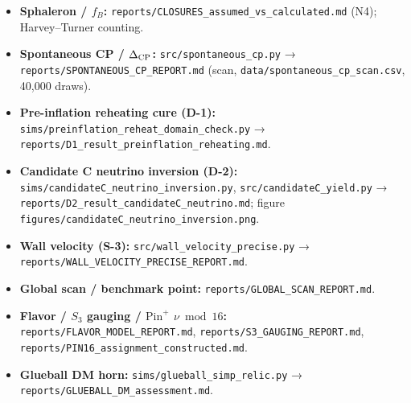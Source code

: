\documentclass[aps,prd,preprint,nofootinbib,superscriptaddress]{revtex4-2}
\providecommand{\tightlist}{\setlength{\itemsep}{0pt}\setlength{\parskip}{0pt}}
\begin{document}
\begin{itemize}
\tightlist
\item
  \textbf{Sphaleron / \(f_B\):}
  \texttt{reports/\allowbreak CLOSURES\_\allowbreak assumed\_\allowbreak vs\_\allowbreak calculated.\allowbreak md} (N4);
  Harvey--Turner counting.
\item
  \textbf{Spontaneous CP / \(\Delta_{\rm CP}\):}
  \texttt{src/\allowbreak spontaneous\_\allowbreak cp.\allowbreak py} →
  \texttt{reports/\allowbreak SPONTANEOUS\_\allowbreak CP\_\allowbreak REPORT.\allowbreak md} (scan,
  \texttt{data/\allowbreak spontaneous\_\allowbreak cp\_\allowbreak scan.\allowbreak csv}, 40,000 draws).
\item
  \textbf{Pre-inflation reheating cure (D-1):}
  \texttt{sims/\allowbreak preinflation\_\allowbreak reheat\_\allowbreak domain\_\allowbreak check.\allowbreak py} →
  \texttt{reports/\allowbreak D1\_\allowbreak result\_\allowbreak preinflation\_\allowbreak reheating.\allowbreak md}.
\item
  \textbf{Candidate C neutrino inversion (D-2):}
  \texttt{sims/\allowbreak candidateC\_\allowbreak neutrino\_\allowbreak inversion.\allowbreak py},
  \texttt{src/\allowbreak candidateC\_\allowbreak yield.\allowbreak py} →
  \texttt{reports/\allowbreak D2\_\allowbreak result\_\allowbreak candidateC\_\allowbreak neutrino.\allowbreak md}; figure
  \texttt{figures/\allowbreak candidateC\_\allowbreak neutrino\_\allowbreak inversion.\allowbreak png}.
\item
  \textbf{Wall velocity (S-3):} \texttt{src/\allowbreak wall\_\allowbreak velocity\_\allowbreak precise.\allowbreak py}
  → \texttt{reports/\allowbreak WALL\_\allowbreak VELOCITY\_\allowbreak PRECISE\_\allowbreak REPORT.\allowbreak md}.
\item
  \textbf{Global scan / benchmark point:}
  \texttt{reports/\allowbreak GLOBAL\_\allowbreak SCAN\_\allowbreak REPORT.\allowbreak md}.
\item
  \textbf{Flavor / \(S_3\) gauging / \(\mathrm{Pin}^+\)
  \(\nu \bmod 16\):} \texttt{reports/\allowbreak FLAVOR\_\allowbreak MODEL\_\allowbreak REPORT.\allowbreak md},
  \texttt{reports/\allowbreak S3\_\allowbreak GAUGING\_\allowbreak REPORT.\allowbreak md},
  \texttt{reports/\allowbreak PIN16\_\allowbreak assignment\_\allowbreak constructed.\allowbreak md}.
\item
  \textbf{Glueball DM horn:} \texttt{sims/\allowbreak glueball\_\allowbreak simp\_\allowbreak relic.\allowbreak py} →
  \texttt{reports/\allowbreak GLUEBALL\_\allowbreak DM\_\allowbreak assessment.\allowbreak md}.

\end{itemize}
\end{document}
